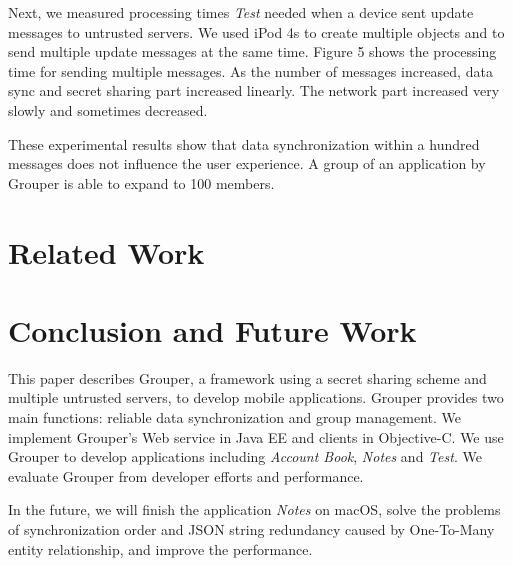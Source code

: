 \documentclass[twocolumn,10pt]{article}
\begin{document}
Next, we measured processing times \emph{Test} needed when a device sent update messages to untrusted servers.
We used iPod 4s to create multiple objects and to send multiple update messages at the same time.
Figure 5 shows the processing time for sending multiple messages. 
As the number of messages increased, data sync and secret sharing part increased linearly. 
The network part increased very slowly and sometimes decreased.

These experimental results show that data synchronization within a hundred messages does not influence the user experience. A group of an application by Grouper is able to expand to 100 members. 

\section{Related Work}



\section{Conclusion and Future Work}

This paper describes Grouper, a framework using a secret sharing scheme and multiple untrusted servers, to develop mobile applications.
Grouper provides two main functions: reliable data synchronization and group management. 
We implement Grouper's Web service in Java EE and clients in Objective-C. 
We use Grouper to develop applications including \emph{Account Book}, \emph{Notes} and \emph{Test}. 
We evaluate Grouper from developer efforts and performance. 

In the future, we will finish the application \emph{Notes} on macOS, solve the problems of synchronization order and JSON string redundancy caused by One-To-Many entity relationship, and improve the performance.


{
	\footnotesize
	
}
\end{document}
